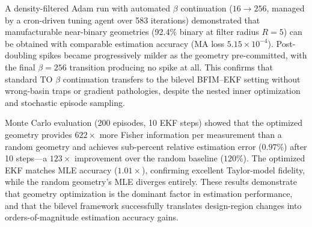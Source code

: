 \documentclass[11pt,a4paper]{article}
\begin{document}
A density-filtered Adam run with automated $\beta$ continuation ($16 \to 256$, managed by a cron-driven tuning agent over 583 iterations) demonstrated that manufacturable near-binary geometries (92.4\% binary at filter radius $R = 5$) can be obtained with comparable estimation accuracy (MA loss $5.15 \times 10^{-4}$).  Post-doubling spikes became progressively milder as the geometry pre-committed, with the final $\beta = 256$ transition producing no spike at all.  This confirms that standard TO $\beta$ continuation transfers to the bilevel BFIM--EKF setting without wrong-basin traps or gradient pathologies, despite the nested inner optimization and stochastic episode sampling.

Monte Carlo evaluation (200 episodes, 10 EKF steps) showed that the optimized geometry provides $622\times$ more Fisher information per measurement than a random geometry and achieves sub-percent relative estimation error ($0.97\%$) after 10 steps---a $123\times$ improvement over the random baseline ($120\%$).  The optimized EKF matches MLE accuracy ($1.01\times$), confirming excellent Taylor-model fidelity, while the random geometry's MLE diverges entirely.  These results demonstrate that geometry optimization is the dominant factor in estimation performance, and that the bilevel framework successfully translates design-region changes into orders-of-magnitude estimation accuracy gains.
\end{document}
